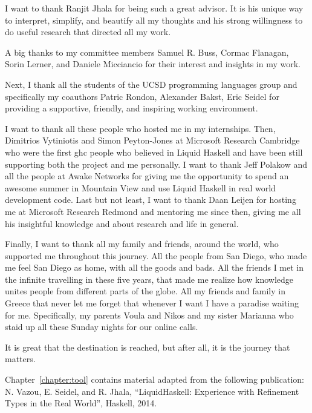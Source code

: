 I want to thank Ranjit Jhala for being such a great advisor. 
%
It is his unique way to interpret, simplify, and beautify all my 
thoughts
and his strong willingness to do useful research 
that directed all my work. 

A big thanks to my committee members 
Samuel R. Buss, 
Cormac Flanagan,
Sorin Lerner, 
and Daniele Micciancio for their interest and insights in my work. 

Next, I thank all the students of the UCSD programming languages group and specifically my coauthors
Patric Rondon,
Alexander Bakst, 
Eric Seidel 
for providing a supportive, friendly, and inspiring working environment.

I want to thank all these people who hosted me in my internships. 
%
%
Then, Dimitrios Vytiniotis and Simon Peyton-Jones
at Microsoft Research Cambridge
who were the first ghc people who believed in Liquid Haskell
and have been still supporting both the project and me personally.
%
I want to thank Jeff Polakow and all the people at Awake Networks 
for giving me the opportunity to spend an awesome summer in Mountain View 
and use Liquid Haskell in real world development code. 
%
Last but not least, 
I want to thank Daan Leijen 
for hosting me at Microsoft Research Redmond 
and mentoring me since then, giving me all his insightful
knowledge and  about research and life in general.

Finally, I want to thank all my family and friends, around the world,
who supported me throughout this journey.
%
All the people from San Diego, 
who made me feel San Diego as home, with all the goods and bads. 
%
All the friends I met in the infinite travelling in these five years, 
that made me realize how knowledge unites people from different parts of the globe.
%
All my friends and family in Greece that never let me forget that
whenever I want I have a paradise waiting for me.  
%
Specifically, my parents Voula and Nikos and my sister Marianna
who staid up all these Sunday nights for our online calls. 

It is great that the destination is reached, 
but after all, it is the journey that matters. 

\newpage

Chapter~\ref{chapter:tool} contains material adapted from the following publication:
\noindent N. Vazou, E. Seidel, and R. Jhala,
``LiquidHaskell: Experience with Refinement Types in the Real World'', 
Haskell, 2014.

